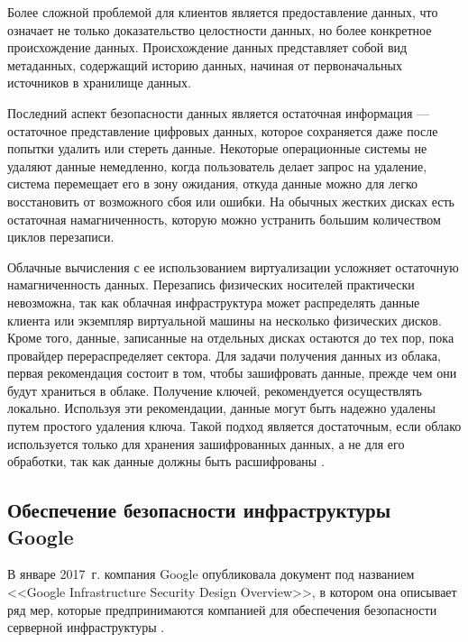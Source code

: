 Более сложной проблемой для клиентов является предоставление данных, что означает не только доказательство целостности данных, но более конкретное происхождение данных.
Происхождение данных представляет собой вид метаданных, содержащий историю данных, начиная от первоначальных источников в хранилище данных.

Последний аспект безопасности данных является остаточная информация --- остаточное представление цифровых данных, которое сохраняется даже после попытки удалить или стереть данные.
Некоторые операционные системы не удаляют данные немедленно, когда пользователь делает запрос на удаление, система перемещает его в зону ожидания, откуда данные можно для легко восстановить от возможного сбоя или ошибки.
На обычных жестких дисках есть остаточная намагниченность, которую можно устранить большим количеством циклов перезаписи.

Облачные вычисления с ее использованием виртуализации усложняет остаточную намагниченность данных.
Перезапись физических носителей практически невозможна, так как облачная инфраструктура может распределять данные клиента или экземпляр виртуальной машины на несколько физических дисков.
Кроме того, данные, записанные на отдельных дисках остаются до тех пор, пока провайдер перераспределяет сектора.
Для задачи получения данных из облака, первая рекомендация состоит в том, чтобы зашифровать данные, прежде чем они будут храниться в облаке.
Получение ключей, рекомендуется осуществлять локально.
Используя эти рекомендации, данные могут быть надежно удалены путем простого удаления ключа.
Такой подход является достаточным, если облако используется только для хранения зашифрованных данных, а не для его обработки, так как данные должны быть расшифрованы \cite{zap}.

\subsection{Обеспечение безопасности инфраструктуры Google}

В январе 2017~г. компания Google опубликовала документ под названием <<Google Infrastructure Security Design Overview>>, в котором она описывает ряд мер, которые предпринимаются компанией для обеспечения безопасности серверной инфраструктуры \cite{google}.

